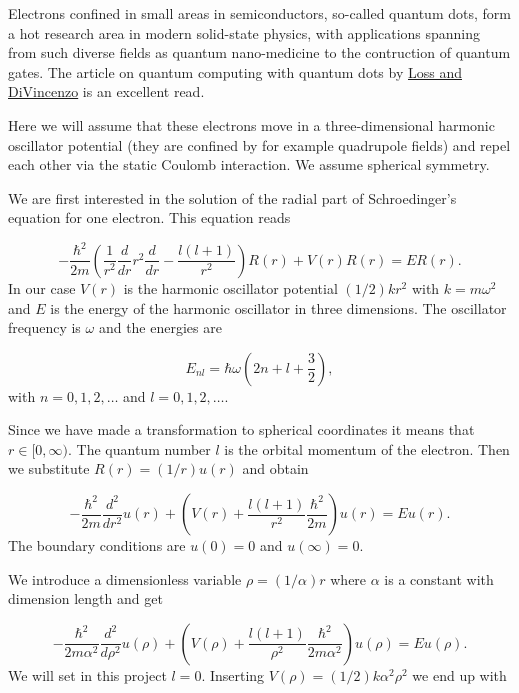 \documentclass[%
oneside,                 %
final,                   %
10pt]{article}
\begin{document}
Electrons confined in small areas in semiconductors, so-called quantum
dots, form a hot research area in modern solid-state physics, with
applications spanning from such diverse fields as quantum
nano-medicine to the contruction of quantum gates. 
The article on quantum computing with quantum dots by \href{{http://journals.aps.org/pra/abstract/10.1103/PhysRevA.57.120}}{Loss and DiVincenzo} is an excellent read.

Here we will assume that these electrons move in a three-dimensional harmonic
oscillator potential (they are confined by for example quadrupole fields)
and repel  each other via the static Coulomb interaction.  
We assume spherical symmetry.  

We are first interested in the solution of the radial part of Schroedinger's equation for one electron. This equation reads

\begin{equation*}
  -\frac{\hbar^2}{2 m} \left ( \frac{1}{r^2} \frac{d}{dr} r^2
  \frac{d}{dr} - \frac{l (l + 1)}{r^2} \right )R(r) 
     + V(r) R(r) = E R(r).
\end{equation*}
In our case $V(r)$ is the harmonic oscillator potential $(1/2)kr^2$ with
$k=m\omega^2$ and $E$ is
the energy of the harmonic oscillator in three dimensions.
The oscillator frequency is $\omega$ and the energies are

\begin{equation*}
E_{nl}=  \hbar \omega \left(2n+l+\frac{3}{2}\right),
\end{equation*}
with $n=0,1,2,\dots$ and $l=0,1,2,\dots$.

Since we have made a transformation to spherical coordinates it means that 
$r\in [0,\infty)$.  
The quantum number
$l$ is the orbital momentum of the electron.  
% 
Then we substitute $R(r) = (1/r) u(r)$ and obtain
% 

\begin{equation*}
  -\frac{\hbar^2}{2 m} \frac{d^2}{dr^2} u(r) 
       + \left ( V(r) + \frac{l (l + 1)}{r^2}\frac{\hbar^2}{2 m}
                                    \right ) u(r)  = E u(r) .
\end{equation*}
% 
The boundary conditions are $u(0)=0$ and $u(\infty)=0$.

We introduce a dimensionless variable $\rho = (1/\alpha) r$
where $\alpha$ is a constant with dimension length and get
% 

\begin{equation*}
  -\frac{\hbar^2}{2 m \alpha^2} \frac{d^2}{d\rho^2} u(\rho) 
       + \left ( V(\rho) + \frac{l (l + 1)}{\rho^2}
         \frac{\hbar^2}{2 m\alpha^2} \right ) u(\rho)  = E u(\rho) .
\end{equation*}
% 
We will set in this project $l=0$.
Inserting $V(\rho) = (1/2) k \alpha^2\rho^2$ we end up with
\end{document}
